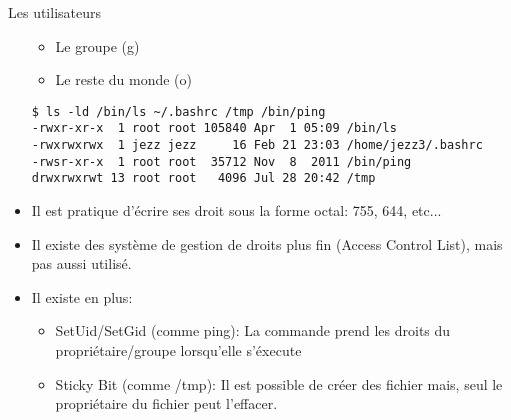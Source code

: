 \begin{frame}[fragile=singleslide]{Les utilisateurs}
\begin{itemize}
\begin{itemize}
    \item Le groupe (g)
    \item Le reste du monde (o)
    \end{itemize}
    \begin{lstlisting}
$ ls -ld /bin/ls ~/.bashrc /tmp /bin/ping
-rwxr-xr-x  1 root root 105840 Apr  1 05:09 /bin/ls
-rwxrwxrwx  1 jezz jezz     16 Feb 21 23:03 /home/jezz3/.bashrc
-rwsr-xr-x  1 root root  35712 Nov  8  2011 /bin/ping
drwxrwxrwt 13 root root   4096 Jul 28 20:42 /tmp
   \end{lstlisting}
 \item Il est pratique d'écrire ses droit sous la forme octal: 755, 644, etc...
 \item Il existe des système de gestion de droits plus fin (Access Control List), mais pas aussi utilisé.
   \item Il existe en plus:
\begin{itemize}
  \item SetUid/SetGid (comme ping): La commande prend les droits du propriétaire/groupe lorsqu'elle s'éxecute
  \item Sticky Bit (comme /tmp): Il est possible de créer des fichier mais, seul le propriétaire du fichier peut l'effacer.
\end{itemize}
\end{itemize}
\end{frame}

